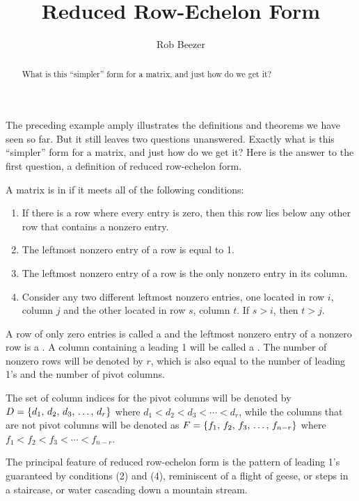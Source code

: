 \documentclass{ximera}
\author{Rob Beezer}
\title{Reduced Row-Echelon Form}
\begin{document}
\begin{abstract}
  What is this ``simpler'' form for a matrix, and just how do we get it?
\end{abstract}
\maketitle

The preceding example amply illustrates the definitions and theorems
we have seen so far.  But it still leaves two questions unanswered.
Exactly what is this ``simpler'' form for a matrix, and just how do we
get it?  Here is the answer to the first question, a definition of
reduced row-echelon form.

\begin{definition}
A matrix is in  if it meets all of the following conditions:
\begin{enumerate}
\item If there is a row where every entry is zero, then this row lies below any other row that contains a nonzero entry.
\item The leftmost nonzero entry of a row is equal to 1.
\item The leftmost nonzero entry of a row is the only nonzero entry in its column.
\item Consider any two different leftmost nonzero entries, one located in row $i$, column $j$ and the other located in row $s$, column $t$.  If $s>i$, then $t>j$.
\end{enumerate}
A row of only zero entries is called a  and the leftmost nonzero entry of a nonzero row is a .  A column containing a leading 1 will be called a .  The number of nonzero rows will be denoted by $r$, which is also equal to the number of leading 1's and the number of pivot columns.
\end{definition}

The set of column indices for the pivot columns will be denoted by $D=\left\{d_1,\,d_2,\,d_3,\,\ldots,\,d_r\right\}$ where
$d_1<d_2<d_3<\cdots<d_r$,
while the columns that are not pivot columns will be denoted as $F=\left\{f_1,\,f_2,\,f_3,\,\ldots,\,f_{n-r}\right\}$ where
$f_1<f_2<f_3<\cdots<f_{n-r}$.

The principal feature of reduced row-echelon form is the pattern of
leading 1's guaranteed by conditions (2) and (4), reminiscent of a
flight of geese, or steps in a staircase, or water cascading down a
mountain stream.
\end{document}
